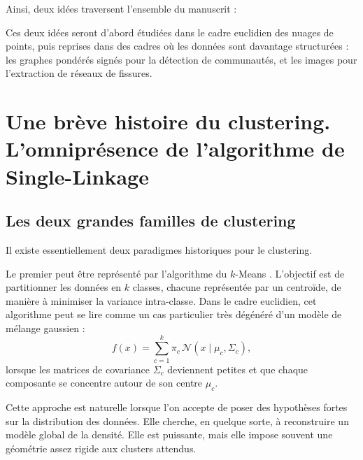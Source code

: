 Ainsi, deux idées traversent l'ensemble du manuscrit :

Ces deux idées seront d'abord étudiées dans le cadre euclidien des nuages de points, puis reprises dans des cadres où les données sont davantage structurées : les graphes pondérés signés pour la détection de communautés, et les images pour l'extraction de réseaux de fissures.

\section{Une brève histoire du clustering. L'omniprésence de l'algorithme de Single-Linkage}

\subsection{Les deux grandes familles de clustering}

Il existe essentiellement deux paradigmes historiques pour le clustering.

Le premier peut être représenté par l'algorithme du $k$-Means \cite{Lloyd1982, Draganov2025}. L'objectif est de partitionner les données en $k$ classes, chacune représentée par un centroïde, de manière à minimiser la variance intra-classe. Dans le cadre euclidien, cet algorithme peut se lire comme un cas particulier très dégénéré d'un modèle de mélange gaussien :
\begin{equation}
        f(x)
    =
    \sum_{c=1}^{k}
    \pi_c\,\mathcal{N}(x\mid \mu_c,\Sigma_c),
\end{equation}
lorsque les matrices de covariance $\Sigma_c$ deviennent petites et que chaque composante se concentre autour de son centre $\mu_c$.

Cette approche est naturelle lorsque l'on accepte de poser des hypothèses fortes sur la distribution des données. Elle cherche, en quelque sorte, à reconstruire un modèle global de la densité. Elle est puissante, mais elle impose souvent une géométrie assez rigide aux clusters attendus.

